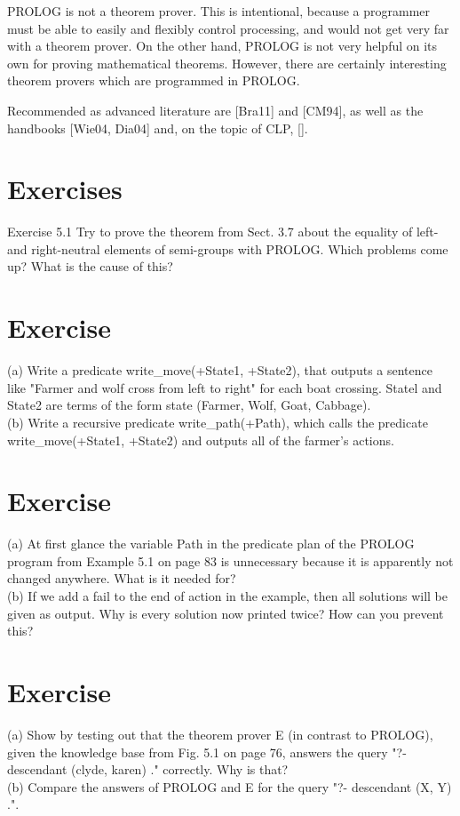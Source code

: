 \documentclass[10pt]{book}
\begin{document}
PROLOG is not a theorem prover. This is intentional, because a programmer must be able to easily and flexibly control processing, and would not get very far with a theorem prover. On the other hand, PROLOG is not very helpful on its own for proving mathematical theorems. However, there are certainly interesting theorem provers which are programmed in PROLOG.

Recommended as advanced literature are [Bra11] and [CM94], as well as the handbooks [Wie04, Dia04] and, on the topic of CLP, [\cite{bartak1998online}].

\section{Exercises}
Exercise 5.1 Try to prove the theorem from Sect. 3.7 about the equality of left- and right-neutral elements of semi-groups with PROLOG. Which problems come up? What is the cause of this?

\section{Exercise}
(a) Write a predicate write\_move(+State1, +State2), that outputs a sentence like "Farmer and wolf cross from left to right" for each boat crossing. Statel and State2 are terms of the form state (Farmer, Wolf, Goat, Cabbage).\\
(b) Write a recursive predicate write\_path(+Path), which calls the predicate write\_move(+State1, +State2) and outputs all of the farmer's actions.

\section{Exercise}
(a) At first glance the variable Path in the predicate plan of the PROLOG program from Example 5.1 on page 83 is unnecessary because it is apparently not changed anywhere. What is it needed for?\\
(b) If we add a fail to the end of action in the example, then all solutions will be given as output. Why is every solution now printed twice? How can you prevent this?

\section{Exercise}
(a) Show by testing out that the theorem prover E (in contrast to PROLOG), given the knowledge base from Fig. 5.1 on page 76, answers the query "?- descendant (clyde, karen) ." correctly. Why is that?\\
(b) Compare the answers of PROLOG and E for the query "?- descendant (X, Y) .".
\end{document}
